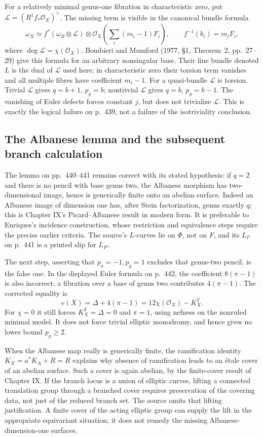 For a relatively minimal genus-one fibration in characteristic zero, put \(\mathcal L=(R^1f_*\mathcal O_X)^\vee\). The missing term is visible in the canonical bundle formula
\[
\omega_X\simeq f^*(\omega_B\otimes\mathcal L)
 \otimes\mathcal O_X\left(\sum_i(m_i-1)F_i\right),
\qquad f^{-1}(b_i)=m_iF_i,
\]
where \(\deg\mathcal L=\chi(\mathcal O_X)\). Bombieri and Mumford (1977, \S1, Theorem~2, pp.~27--29) give this formula for an arbitrary nonsingular base. Their line bundle denoted \(L\) is the dual of \(\mathcal L\) used here; in characteristic zero their torsion term vanishes and all multiple fibres have coefficient \(m_i-1\). For a quasi-bundle \(\mathcal L\) is torsion. Trivial \(\mathcal L\) gives \(q=b+1\), \(p_g=b\); nontrivial \(\mathcal L\) gives \(q=b\), \(p_g=b-1\). The vanishing of Euler defects forces constant \(j\), but does not trivialize \(\mathcal L\). This is exactly the logical failure on p.~439, not a failure of the isotriviality conclusion.

\subsection{The Albanese lemma and the subsequent branch calculation}

The lemma on pp.~440--441 remains correct with its stated hypothesis: if \(q=2\) and there is no pencil with base genus two, the Albanese morphism has two-dimensional image, hence is generically finite onto an abelian surface. Indeed an Albanese image of dimension one has, after Stein factorization, genus exactly \(q\); this is Chapter IX's Picard--Albanese result in modern form. It is preferable to Enriques's incidence construction, whose restriction and equivalence steps require the precise earlier criteria. The source's \(L\)-curves lie on \(\Phi\), not on \(F\), and its \(L_{I'}\) on p.~441 is a printed slip for \(L_{P'}\).

The next step, asserting that \(p_a=-1,p_g=1\) excludes that genus-two pencil, is the false one. In the displayed Euler formula on p.~442, the coefficient \(8(\pi-1)\) is also incorrect: a fibration over a base of genus two contributes \(4(\pi-1)\). The corrected equality is
\[
e(X)=\Delta+4(\pi-1)=12\chi(\mathcal O_X)-K_X^2.
\]
For \(\chi=0\) it still forces \(K_X^2=\Delta=0\) and \(\pi=1\), using nefness on the nonruled minimal model. It does not force trivial elliptic monodromy, and hence gives no lower bound \(p_g\ge2\).

When the Albanese map really is generically finite, the ramification identity \(K_X=a^*K_A+R=R\) explains why absence of ramification leads to an \'etale cover of an abelian surface. Such a cover is again abelian, by the finite-cover result of Chapter IX. If the branch locus is a union of elliptic curves, lifting a connected translation group through a branched cover requires preservation of the covering data, not just of the reduced branch set. The source omits that lifting justification. A finite cover of the acting elliptic group can supply the lift in the appropriate equivariant situation; it does not remedy the missing Albanese-dimension-one surfaces.


